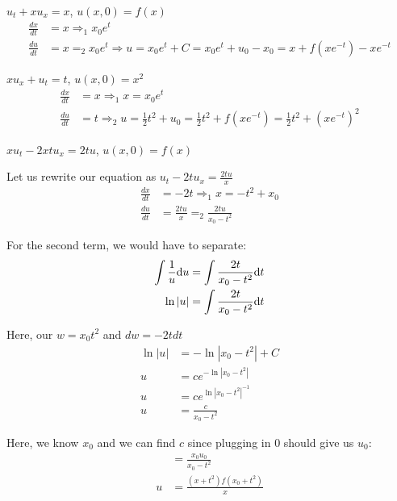 \documentclass{article}
\begin{document}
\ex $u_t + xu_x = x$, $u(x, 0) = f(x)$
%
\begin{align}
  \frac{dx}{dt} & = x \Rightarrow_1 x_0 e^t\\
  \frac{du}{dt} & = x =_2 x_0e^t \Rightarrow u = x_0e^t + C
  = x_0 e^t + u_0 - x_0 = x + f(xe^{-t}) - xe^{-t}
\end{align}

\ex $xu_x + u_t = t$, $u(x, 0) = x^2$
%
\begin{align}
  \frac{dx}{dt} & = x \Rightarrow_1 x = x_0 e^t\\
  \frac{du}{dt} & = t \Rightarrow_2 u = \frac{1}{2} t^2 + u_0
  = \frac{1}{2}t^2 + f\left(xe^{-t}\right)
  = \frac{1}{2}t^2 + \left(xe^{-t}\right)^2
\end{align}

\ex $xu_t - 2xtu_x = 2tu$, $u(x, 0) = f(x)$

Let us rewrite our equation as $u_t - 2tu_x = \frac{2tu}{x}$
%
\begin{align}
  \frac{dx}{dt} & = -2t \Rightarrow_1 x = -t^2 + x_0\\
  \frac{du}{dt} & = \frac{2tu}{x} =_2 \frac{2tu}{x_0 - t^2}
\end{align}

For the second term, we would have to separate:
%
\begin{align}
  \int \frac{1}{u} \text du & = \int \frac{2t}{x_0 - t^2} \text dt\\
  \ln |u| & = \int \frac{2t}{x_0 - t^2} \text dt
\end{align}

Here, our $w = x_0 t^2$ and $dw = -2t dt$
%
\begin{align}
  \ln |u| & = - \ln |x_0 - t^2| + C\\
  u & = ce^{-\ln|x_0 - t^2|}\\
  u & = ce^{\ln|x_0 - t^2|^{-1}}\\
  u & = \frac{c}{x_0 - t^2}
\end{align}

Here, we know $x_0$ and we can find $c$ since plugging in $0$ should give us
$u_0$:
%
\begin{align}
  & = \frac{x_0 u_0}{x_0 - t^2}\\
  u & = \frac{(x + t^2) f(x_0 + t^2)}{x}
\end{align}
\end{document}
